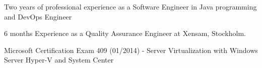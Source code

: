 \linebreak

\begin{cvparagraph}

\begin{cvitems}
\item {Two years of professional experience as a Software Engineer in Java programming and
DevOps Engineer}
\item {6 months Experience as a Quality Assurance Engineer at Xensam, Stockholm.}
\item {Microsoft Certification Exam 409 (01/2014) - Server Virtualization with Windows Server
Hyper-V and System Center}
\end{cvitems}
\end{cvparagraph}


